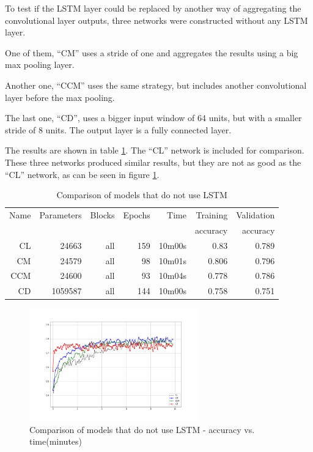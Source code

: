 To test if 
the LSTM layer could be replaced by 
another way of aggregating the convolutional layer outputs, three networks were constructed without any LSTM layer.

One of them, ``CM'' uses a stride of one and aggregates the results using a big max pooling layer.

Another one, ``CCM'' uses the same strategy, but includes another convolutional layer before the max pooling.

The last one, ``CD'', uses a bigger input window of 64 units, but with a smaller stride of 8 units. The output layer is a fully connected layer.

The results are shown in table \ref{tab:carvingnolstm}. The ``CL'' network is included for comparison.
These three networks produced similar results, but they are not as good as the ``CL'' network, as can be seen in figure
\ref{fig:nolstm}.


\begin{table}[!ht]
    \centering
    \caption[No LSTM]{Comparison of models that do not use LSTM}
    \label{tab:carvingnolstm}
\begin{tabular}{r|r|r|r|r|r|r}
\hline
Name & Parameters & Blocks & Epochs & Time & Training          & Validation          \\       
     &            &        &        &         &          accuracy &            accuracy \\ \hline\hline

CL      & 24663     & all   & 159   & 10m00s    & 0.83  & 0.789 \\\hline
CM      & 24579     & all   & 98    & 10m01s    & 0.806 & 0.796 \\\hline
CCM     & 24600     & all   & 93    & 10m04s    & 0.778 & 0.786 \\\hline
CD      & 1059587   & all   & 144   & 10m00s    & 0.758 & 0.751 \\\hline
\end{tabular}
\end{table}

\begin{figure}[htb!]
\centering\includegraphics[width=0.65\textwidth]{content/CL-CM-CCM-CD.png}
\caption[No LSTM]{\label{fig:nolstm}Comparison of models that do not use LSTM - accuracy vs. time(minutes)}%
\end{figure}

